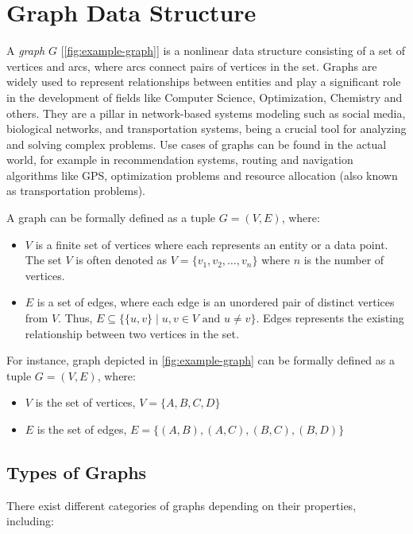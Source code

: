 \documentclass[../Thesis.tex]{subfiles}
\begin{document}
	
	\section{Graph Data Structure}
	\label{sec:graph_data_structure}
	
	A \emph{graph} $G$ [\autoref{fig:example-graph}] is a nonlinear data structure consisting of a set of vertices and arcs, where arcs connect pairs of vertices in the set. Graphs are widely used to represent relationships between entities and play a significant role in the development of fields like Computer Science, Optimization, Chemistry and others. They are a pillar in network-based systems modeling such as social media, biological networks, and transportation systems, being a crucial tool for analyzing and solving complex problems. Use cases of graphs can be found in the actual world, for example in recommendation systems, routing and navigation algorithms like GPS, optimization problems and resource allocation (also known as transportation problems).
	
	
	
	A graph can be formally defined as a tuple $G = (V, E)$, where:
	\begin{itemize}
		\item $V$ is a finite set of vertices where each represents an entity or a data point. The set $V$ is often denoted as $V = \{v_1, v_2, \ldots, v_n\}$ where $n$ is the number of vertices.
		\item $E$ is a set of edges, where each edge is an unordered pair of distinct vertices from $V$. Thus, $E \subseteq \{\{u, v\} \mid u, v \in V \text{ and } u \neq v\}$. Edges represents the existing relationship between two vertices in the set.
	\end{itemize}
	
	For instance, graph depicted in \autoref{fig:example-graph} can be formally defined as a tuple \( G = (V, E) \), where:
	\begin{itemize}
		\item \( V \) is the set of vertices, \( V = \{A, B, C, D\} \)
		\item \( E \) is the set of edges, \( E = \{(A, B), (A, C), (B, C), (B, D)\} \)
	\end{itemize}
	
	\subsection{Types of Graphs}
	There exist different categories of graphs depending on their properties, including:
	
\end{document}
